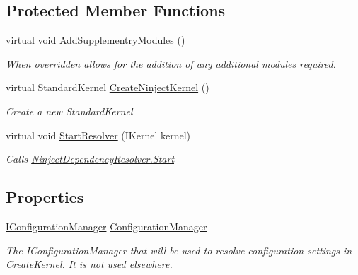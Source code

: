 \subsection*{Protected Member Functions}
\begin{DoxyCompactItemize}
\item 
virtual void \hyperlink{classCqrs_1_1Ninject_1_1Configuration_1_1SimplifiedNinjectStartUp_a481f691fbc1eec3f793a3b5769d83e5c_a481f691fbc1eec3f793a3b5769d83e5c}{Add\+Supplementry\+Modules} ()
\begin{DoxyCompactList}\small\item\em When overridden allows for the addition of any additional \hyperlink{}{modules} required. \end{DoxyCompactList}\item 
virtual Standard\+Kernel \hyperlink{classCqrs_1_1Ninject_1_1Configuration_1_1SimplifiedNinjectStartUp_a4a503b092601f347cfe320e3b6f1d26e_a4a503b092601f347cfe320e3b6f1d26e}{Create\+Ninject\+Kernel} ()
\begin{DoxyCompactList}\small\item\em Create a new Standard\+Kernel \end{DoxyCompactList}\item 
virtual void \hyperlink{classCqrs_1_1Ninject_1_1Configuration_1_1SimplifiedNinjectStartUp_a4f7b687c63d3fed34ddd9d3d1ecae6aa_a4f7b687c63d3fed34ddd9d3d1ecae6aa}{Start\+Resolver} (I\+Kernel kernel)
\begin{DoxyCompactList}\small\item\em Calls \hyperlink{classCqrs_1_1Ninject_1_1Configuration_1_1NinjectDependencyResolver_adc6171ed45679dcbaa67782770ba5083_adc6171ed45679dcbaa67782770ba5083}{Ninject\+Dependency\+Resolver.\+Start} \end{DoxyCompactList}\end{DoxyCompactItemize}
\subsection*{Properties}
\begin{DoxyCompactItemize}
\item 
\hyperlink{interfaceCqrs_1_1Configuration_1_1IConfigurationManager}{I\+Configuration\+Manager} \hyperlink{classCqrs_1_1Ninject_1_1Configuration_1_1SimplifiedNinjectStartUp_ae47357929d5c42f602a97e6b5dd6b0c4_ae47357929d5c42f602a97e6b5dd6b0c4}{Configuration\+Manager}
\begin{DoxyCompactList}\small\item\em The I\+Configuration\+Manager that will be used to resolve configuration settings in \hyperlink{classCqrs_1_1Ninject_1_1Configuration_1_1SimplifiedNinjectStartUp_aac5ea630535b31520d4c1536bc8125ce_aac5ea630535b31520d4c1536bc8125ce}{Create\+Kernel}. It is not used elsewhere. \end{DoxyCompactList}\end{DoxyCompactItemize}


